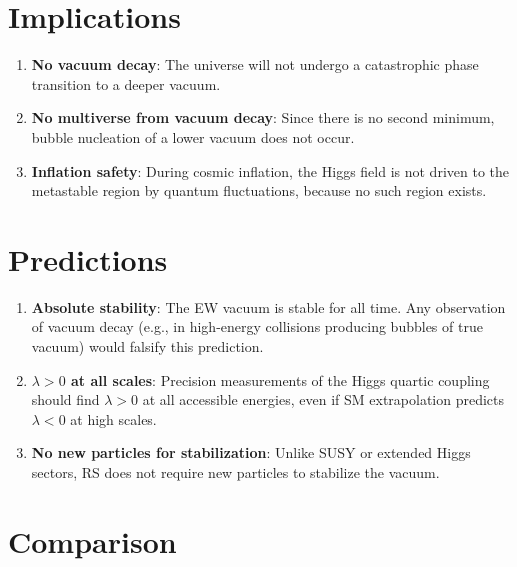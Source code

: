 \documentclass[12pt,a4paper]{article}
\theoremstyle{definition}
\theoremstyle{remark}
\begin{document}
\section{Implications}
\label{sec:implications}

\begin{enumerate}
  \item \textbf{No vacuum decay}: The universe will not undergo
  a catastrophic phase transition to a deeper vacuum.

  \item \textbf{No multiverse from vacuum decay}: Since there is
  no second minimum, bubble nucleation of a lower vacuum does not
  occur.

  \item \textbf{Inflation safety}: During cosmic inflation, the
  Higgs field is not driven to the metastable region by quantum
  fluctuations, because no such region exists.
\end{enumerate}

\section{Predictions}
\label{sec:predictions}

\begin{enumerate}
  \item \textbf{Absolute stability}: The EW vacuum is stable for
  all time.  Any observation of vacuum decay (e.g., in high-energy
  collisions producing bubbles of true vacuum) would falsify this
  prediction.

  \item \textbf{$\lambda > 0$ at all scales}: Precision
  measurements of the Higgs quartic coupling should find
  $\lambda > 0$ at all accessible energies, even if SM extrapolation
  predicts $\lambda < 0$ at high scales.

  \item \textbf{No new particles for stabilization}: Unlike SUSY or
  extended Higgs sectors, RS does not require new particles to
  stabilize the vacuum.
\end{enumerate}

\section{Comparison}
\label{sec:comparison}
\end{document}
